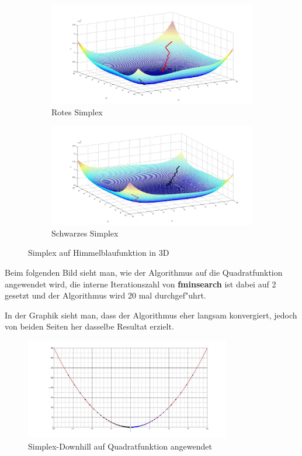 \begin{figure}[htb]
\centering
\begin{subfigure}[b]{0.49\textwidth}
\centering
\includegraphics[width=\textwidth]{downhill/Himmelblau3DRot.jpg}
\caption{Rotes Simplex}
\end{subfigure} \begin{subfigure}[b]{0.49\textwidth}
\centering
\includegraphics[width=\textwidth]{downhill/Himmelblau3DSchwarz.jpg}
\caption{Schwarzes Simplex}
\end{subfigure}
\caption{Simplex auf Himmelblaufunktion in 3D}
\label{fig:Himmelblau}
\end{figure}



Beim folgenden Bild sieht man, wie der Algorithmus auf die Quadratfunktion angewendet wird, die interne Iterationszahl von \textbf{fminsearch} ist dabei auf 2 gesetzt und der Algorithmus wird 20 mal durchgef"uhrt.

In der Graphik sieht man, dass der Algorithmus eher langsam konvergiert, jedoch von beiden Seiten her dasselbe Resultat erzielt. 
\begin{figure}[h]
	\centering
	\includegraphics[width=0.8\textwidth]{downhill/Quadrat.jpg}%
  	\caption{Simplex-Downhill auf Quadratfunktion angewendet}%
	\label{fig:SQ1}%
\end{figure}
